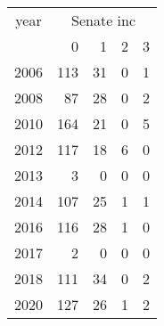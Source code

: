 \footnotesize\begin{tabular}[t]{lrrrr}
\toprule
\multicolumn{1}{c}{year} & \multicolumn{4}{c}{Senate inc} \\
\cmidrule(l{3pt}r{3pt}){1-1} \cmidrule(l{3pt}r{3pt}){2-5}
  & 0 & 1 & 2 & 3\\
\midrule
2006 & 113 & 31 & 0 & 1\\
2008 & 87 & 28 & 0 & 2\\
2010 & 164 & 21 & 0 & 5\\
2012 & 117 & 18 & 6 & 0\\
2013 & 3 & 0 & 0 & 0\\
2014 & 107 & 25 & 1 & 1\\
2016 & 116 & 28 & 1 & 0\\
2017 & 2 & 0 & 0 & 0\\
2018 & 111 & 34 & 0 & 2\\
2020 & 127 & 26 & 1 & 2\\
\bottomrule
\end{tabular}
